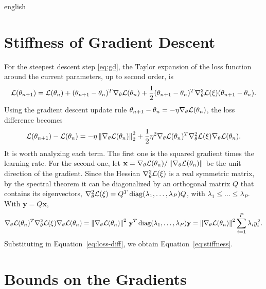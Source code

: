\documentclass[0000.tex]{subfiles}
\begin{document}
\begin{hyphenrules}{english}
\section{Stiffness of Gradient Descent}\label{app-sec:stiffness}

For the steepest descent step \eqref{eq:gd}, the Taylor expansion of the loss function around the
current parameters, up to second order, is
\begin{equation}
  \mathcal{L}(\theta_{n+1})=\mathcal{L}(\theta_n)+(\theta_{n+1}-\theta_n)^{T}\nabla_\theta\mathcal{L}(\theta_n)
  +\frac12(\theta_{n+1}-\theta_n)^{T}\nabla^2_\theta\mathcal{L}(\xi)(\theta_{n+1}-\theta_n).
  \label{eq:taylor}
\end{equation}
Using the gradient descent update rule $\theta_{n+1}-\theta_n=-\eta\nabla_\theta\mathcal{L}(\theta_n)$, the
loss difference becomes
\begin{equation}
  \mathcal{L}(\theta_{n+1})-\mathcal{L}(\theta_n)=-\eta\left\lVert \nabla_\theta\mathcal{L}(\theta_n) \right\rVert_2^2
  +\frac12\eta^2\nabla_\theta\mathcal{L}(\theta_n)^{T}\nabla^2_\theta\mathcal{L}(\xi)\nabla_\theta\mathcal{L}(\theta_n).
  \label{eq:loss-diff}
\end{equation}
It is worth analyzing each term. The first one is the squared gradient times the learning rate. For the
second one, let $\mathbf{x}=\nabla_\theta\mathcal{L}(\theta_n)/\left\lVert \nabla_\theta\mathcal{L}(\theta_n) \right\rVert$ be the unit
direction of the gradient. Since the Hessian $\nabla^2_\theta\mathcal{L}(\xi)$ is a real symmetric matrix, by the
spectral theorem \cite{trefethen1997} it can be diagonalized by an orthogonal matrix $Q$ that contains
its eigenvectors, $\nabla^2_\theta\mathcal{L}(\xi)=Q^{T}\operatorname{diag}(\lambda_1,\dots,\lambda_P)Q$, with
$\lambda_1\le\dots\le\lambda_P$. With $\mathbf{y}=Q\mathbf{x}$,
\begin{equation}
  \nabla_\theta\mathcal{L}(\theta_n)^{T}\nabla^2_\theta\mathcal{L}(\xi)\nabla_\theta\mathcal{L}(\theta_n)
  =\left\lVert \nabla_\theta\mathcal{L}(\theta_n) \right\rVert^2\,\mathbf{y}^{T}\operatorname{diag}(\lambda_1,\dots,\lambda_P)\mathbf{y}
  =\left\lVert \nabla_\theta\mathcal{L}(\theta_n) \right\rVert^2\sum_{i=1}^{P}\lambda_iy_i^2.
  \label{eq:hessian-quadratic}
\end{equation}
Substituting in Equation~\eqref{eq:loss-diff}, we obtain Equation~\eqref{eq:stiffness}.

\section{Bounds on the Gradients}\label{app-sec:grad-bounds}


\end{hyphenrules}
\end{document}
